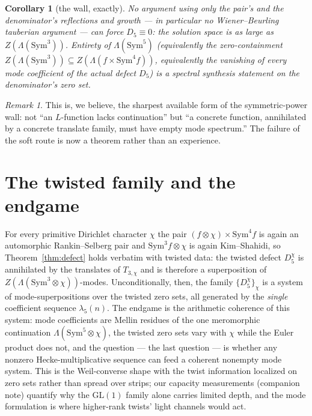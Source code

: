 \documentclass[11pt]{article}
\newtheorem{corollary}[theorem]{Corollary}
\theoremstyle{remark}
\newtheorem{remark}[theorem]{Remark}
\newcommand{\Sym}{\mathrm{Sym}}
\begin{document}
\begin{corollary}[the wall, exactly]\label{cor:wall}
No argument using only the pair's and the denominator's reflections and
growth --- in particular no Wiener--Beurling tauberian argument --- can
force $D_5\equiv0$: the solution space is as large as
$Z(\Lambda(\Sym^3))$.  Entirety of $\Lambda(\Sym^5)$ (equivalently the
zero-containment $Z(\Lambda(\Sym^3))\subseteq Z(\Lambda(f\times\Sym^4f))$,
equivalently the vanishing of every mode coefficient of the actual defect
$D_5$) is a \emph{spectral synthesis} statement on the denominator's zero
set.
\end{corollary}

\begin{remark}
This is, we believe, the sharpest available form of the symmetric-power
wall: not ``an $L$-function lacks continuation'' but ``a concrete function,
annihilated by a concrete translate family, must have empty mode spectrum.''
The failure of the soft route is now a theorem rather than an experience.
\end{remark}

\section{The twisted family and the endgame}

For every primitive Dirichlet character $\chi$ the pair
$(f\otimes\chi)\times\Sym^4f$ is again an automorphic Rankin--Selberg pair
and $\Sym^3f\otimes\chi$ is again Kim--Shahidi, so
Theorem~\ref{thm:defect} holds verbatim with twisted data: the twisted
defect $D_5^{\chi}$ is annihilated by the translates of $T_{3,\chi}$ and is
therefore a superposition of $Z(\Lambda(\Sym^3\otimes\chi))$-modes.
Unconditionally, then, the family $\{D_5^{\chi}\}_\chi$ is a system of
mode-superpositions over the twisted zero sets, all generated by the
\emph{single} coefficient sequence $\lambda_5(n)$.  The endgame is the
arithmetic coherence of this system: mode coefficients are Mellin residues
of the one meromorphic continuation $\Lambda(\Sym^5\otimes\chi)$, the
twisted zero sets vary with $\chi$ while the Euler product does not, and
the question --- the last question --- is whether any nonzero
Hecke-multiplicative sequence can feed a coherent nonempty mode system.
This is the Weil-converse shape with the twist information localized on
zero sets rather than spread over strips; our capacity measurements
(companion note) quantify why the $\mathrm{GL}(1)$ family alone carries
limited depth, and the mode formulation is where higher-rank twists'
light channels would act.
\end{document}
